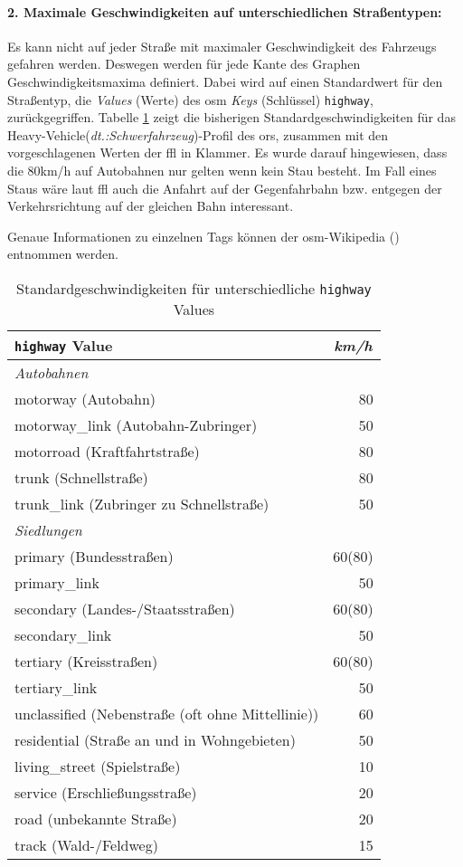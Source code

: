 \paragraph*{2. Maximale Geschwindigkeiten auf unterschiedlichen Straßentypen:}
\label{frage2}
\par
Es kann nicht auf jeder Straße mit maximaler Geschwindigkeit des Fahrzeugs gefahren werden.
Deswegen werden für jede Kante des Graphen Geschwindigkeitsmaxima definiert.
Dabei wird auf einen Standardwert für den Straßentyp, die \textit{Values} (Werte) des \gls{osm} \textit{Keys} (Schlüssel) \texttt{highway}, zurückgegriffen.
Tabelle \ref{tab:speedinfo} zeigt die bisherigen Standardgeschwindigkeiten für das Heavy-Vehicle(\textit{dt.:Schwerfahrzeug})-Profil des \gls{ors}, zusammen mit den vorgeschlagenen Werten der \gls{ffl} in Klammer.
Es wurde darauf hingewiesen, dass die 80km/h auf Autobahnen nur gelten wenn kein Stau besteht.
Im Fall eines Staus wäre laut \gls{ffl} auch die Anfahrt auf der Gegenfahrbahn bzw. entgegen der Verkehrsrichtung auf der gleichen Bahn interessant.

Genaue Informationen zu einzelnen Tags können der \gls{osm}-Wikipedia (\cite{osmwiki}) entnommen werden.

\begin{table}[htb]
\centering
\caption{Standardgeschwindigkeiten für unterschiedliche \texttt{highway} Values}
\label{tab:speedinfo}
\begin{tabular}{|l|r|}
\hline
\multicolumn{1}{|l|}{\texttt{highway} Value} & \multicolumn{1}{c|}{\textit{km/h}} \\
\hline
\multicolumn{2}{|l|}{\textit{Autobahnen}} \\
\hline
motorway (Autobahn) & 80 \\
motorway\_link (Autobahn-Zubringer) & 50 \\
motorroad (Kraftfahrtstraße) & 80 \\
trunk (Schnellstraße) & 80 \\
trunk\_link (Zubringer zu Schnellstraße) & 50 \\
\hline
\multicolumn{1}{|l}{\textit{Siedlungen}} & \multicolumn{1}{l|}{ } \\
\hline
primary (Bundesstraßen) & 60(80) \\
primary\_link  & 50 \\
secondary (Landes-/Staatsstraßen) & 60(80) \\
secondary\_link  & 50 \\
tertiary (Kreisstraßen) & 60(80) \\
tertiary\_link  & 50 \\
unclassified (Nebenstraße (oft ohne Mittellinie))  & 60 \\
residential (Straße an und in Wohngebieten) & 50 \\
living\_street (Spielstraße)  & 10 \\
service (Erschließungsstraße) & 20 \\
road (unbekannte Straße) & 20 \\
track (Wald-/Feldweg) & 15 \\
\hline
\end{tabular}
\end{table}

